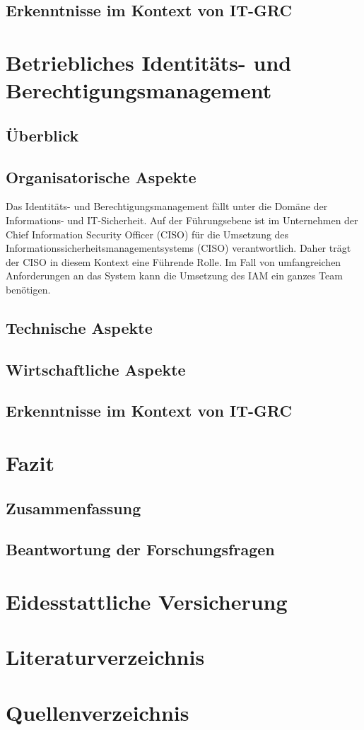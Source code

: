 \documentclass[10pt]{article}
\begin{document}
\subsection{Erkenntnisse im Kontext von IT-GRC}
\section{Betriebliches Identitäts- und Berechtigungsmanagement}
\label{sec:betrieb}
\subsection{Überblick}
\subsection{Organisatorische Aspekte}
Das Identitäts- und Berechtigungsmanagement fällt unter die Domäne der Informations- und IT-Sicherheit. Auf der Führungsebene ist im Unternehmen der Chief Information Security Officer (CISO) für die Umsetzung des Informationssicherheitsmanagementsystems (CISO) verantwortlich. Daher trägt der CISO in diesem Kontext eine Führende Rolle. Im Fall von umfangreichen Anforderungen an das System kann die Umsetzung des IAM ein ganzes Team benötigen.
\subsection{Technische Aspekte}
\subsection{Wirtschaftliche Aspekte}
\subsection{Erkenntnisse im Kontext von IT-GRC}
\section{Fazit}
\subsection{Zusammenfassung}
\subsection{Beantwortung der Forschungsfragen}
\section{Eidesstattliche Versicherung}
\newpage
\section{Literaturverzeichnis}
\printbibliography
\newpage
\section{Quellenverzeichnis}
\end{document}
